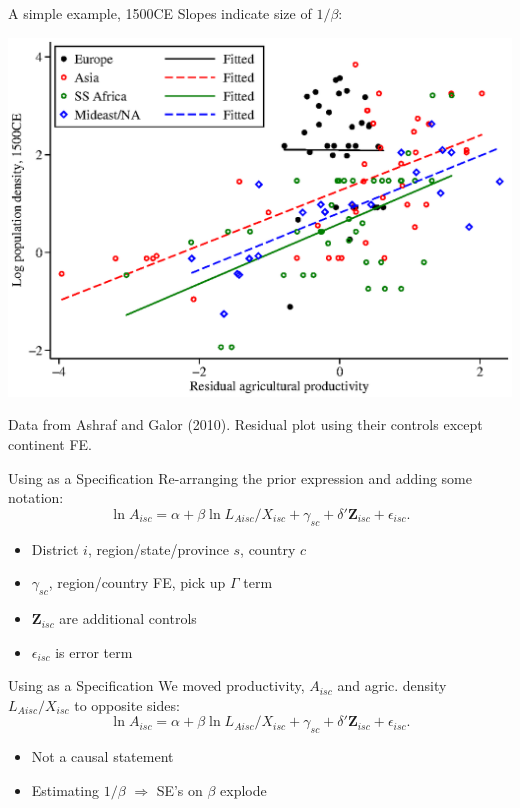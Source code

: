 \documentclass[10pt, xcolor=dvipsnames]{beamer}
\begin{document}
\begin{frame}{A simple example, 1500CE}
Slopes indicate size of $1/\beta$:
\begin{center}
\includegraphics[width=.75\textwidth]{fig_ag_regions.eps}
\end{center}
{\scriptsize Data from Ashraf and Galor (2010). Residual plot using their controls except continent FE.}
\end{frame}

\begin{frame}{Using as a Specification}
Re-arranging the prior expression and adding some notation:
\begin{equation}
  \ln A_{isc} = \alpha + \beta \ln L_{Aisc}/X_{isc} + \gamma_{sc} + \delta' \mathbf{Z}_{isc} + \epsilon_{isc}. \label{EQ_regress}
\end{equation}

\begin{itemize}
  \item District $i$, region/state/province $s$, country $c$
  \item $\gamma_{sc}$, region/country FE, pick up $\Gamma$ term
  \item $\mathbf{Z}_{isc}$ are additional controls
  \item $\epsilon_{isc}$ is error term
\end{itemize}
\end{frame}

\begin{frame}{Using as a Specification}
We moved productivity, $A_{isc}$ and agric. density $L_{Aisc}/X_{isc}$ to opposite sides:
\begin{equation}
  \ln A_{isc} = \alpha + \beta \ln L_{Aisc}/X_{isc} + \gamma_{sc} + \delta' \mathbf{Z}_{isc} + \epsilon_{isc}. \label{EQ_regress}
\end{equation}

\begin{itemize}
  \item Not a causal statement
  \item Estimating $1/\beta$ $\Rightarrow$ SE's on $\beta$ explode
\end{itemize}
\end{frame}
\end{document}
